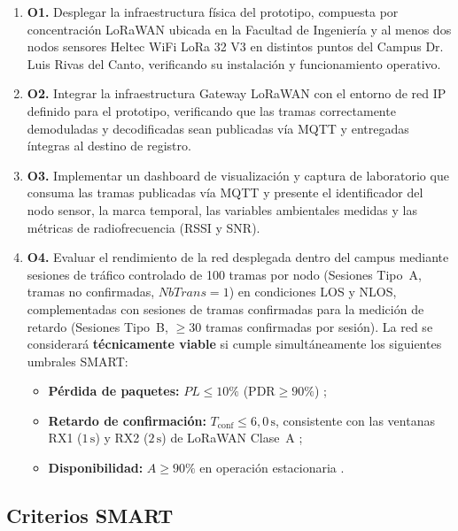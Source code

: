 \documentclass[12pt,oneside,openany,spanish,oldfontcommands]{memoir}
\begin{document}
\begin{enumerate}
    \item \textbf{O1.} Desplegar la infraestructura física del prototipo, compuesta por
    concentración LoRaWAN ubicada en la Facultad de Ingeniería y al menos dos nodos sensores Heltec
    WiFi LoRa 32 V3 en distintos puntos del Campus Dr. Luis Rivas del Canto, verificando su
    instalación y funcionamiento operativo.

    \item \textbf{O2.} Integrar la infraestructura Gateway LoRaWAN con el entorno de red IP definido
    para el prototipo, verificando que las tramas correctamente demoduladas y decodificadas sean
    publicadas vía MQTT y entregadas íntegras al destino de registro.

    \item \textbf{O3.} Implementar un dashboard de visualización y captura de laboratorio que
    consuma las tramas publicadas vía MQTT y presente el identificador del nodo sensor, la marca
    temporal, las variables ambientales medidas y las métricas de radiofrecuencia (RSSI y SNR).

    \item \textbf{O4.} Evaluar el rendimiento de la red desplegada dentro del campus mediante
    sesiones de tráfico controlado de 100 tramas por nodo (Sesiones Tipo~A, tramas no confirmadas,
    $NbTrans = 1$) en condiciones LOS y NLOS, complementadas con sesiones de tramas confirmadas para
    la medición de retardo (Sesiones Tipo~B, $\geq 30$ tramas confirmadas por sesión). La red se
    considerará \textbf{técnicamente viable} si cumple simultáneamente los siguientes umbrales SMART:
    \begin{itemize}
      \item \textbf{Pérdida de paquetes:} $PL \leq 10\%$ ($\text{PDR} \geq 90\%$)
      \parencite{kaur2024campus,ahmed2024vegetacion};
      \item \textbf{Retardo de confirmación:} $T_{\mathrm{conf}} \leq 6,0\,\text{s}$, consistente
      con las ventanas RX1 ($1\,\text{s}$) y RX2 ($2\,\text{s}$) de LoRaWAN Clase~A
      \parencite{lorawan1_0_4};
      \item \textbf{Disponibilidad:} $A \geq 90\%$ en operación estacionaria
      \parencite{barrachina2023campus}.
    \end{itemize}
\end{enumerate}

\subsection{Criterios SMART}
\end{document}
